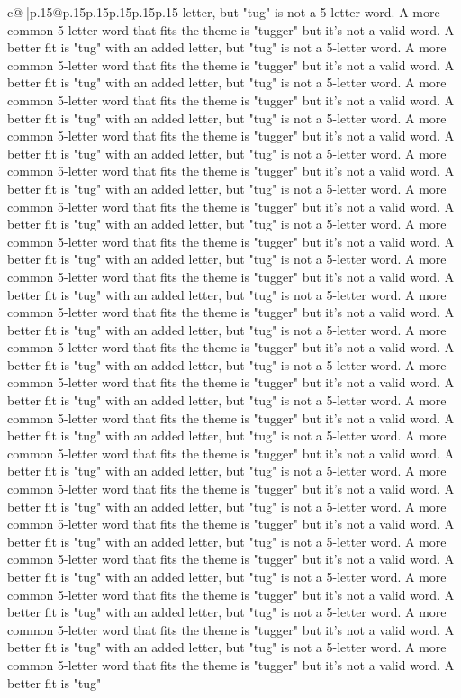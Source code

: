 \documentclass{article}
\begin{document}
{\begin{supertabular}{c@{$\;$}|p{.15\linewidth}@{}p{.15\linewidth}p{.15\linewidth}p{.15\linewidth}p{.15\linewidth}p{.15\linewidth}}
{{{letter, but "tug" is not a 5{-}letter word. A more common 5{-}letter word that fits the theme is "tugger" but it's not a valid word. A better fit is "tug" with an added letter, but "tug" is not a 5{-}letter word. A more common 5{-}letter word that fits the theme is "tugger" but it's not a valid word. A better fit is "tug" with an added letter, but "tug" is not a 5{-}letter word. A more common 5{-}letter word that fits the theme is "tugger" but it's not a valid word. A better fit is "tug" with an added letter, but "tug" is not a 5{-}letter word. A more common 5{-}letter word that fits the theme is "tugger" but it's not a valid word. A better fit is "tug" with an added letter, but "tug" is not a 5{-}letter word. A more common 5{-}letter word that fits the theme is "tugger" but it's not a valid word. A better fit is "tug" with an added letter, but "tug" is not a 5{-}letter word. A more common 5{-}letter word that fits the theme is "tugger" but it's not a valid word. A better fit is "tug" with an added letter, but "tug" is not a 5{-}letter word. A more common 5{-}letter word that fits the theme is "tugger" but it's not a valid word. A better fit is "tug" with an added letter, but "tug" is not a 5{-}letter word. A more common 5{-}letter word that fits the theme is "tugger" but it's not a valid word. A better fit is "tug" with an added letter, but "tug" is not a 5{-}letter word. A more common 5{-}letter word that fits the theme is "tugger" but it's not a valid word. A better fit is "tug" with an added letter, but "tug" is not a 5{-}letter word. A more common 5{-}letter word that fits the theme is "tugger" but it's not a valid word. A better fit is "tug" with an added letter, but "tug" is not a 5{-}letter word. A more common 5{-}letter word that fits the theme is "tugger" but it's not a valid word. A better fit is "tug" with an added letter, but "tug" is not a 5{-}letter word. A more common 5{-}letter word that fits the theme is "tugger" but it's not a valid word. A better fit is "tug" with an added letter, but "tug" is not a 5{-}letter word. A more common 5{-}letter word that fits the theme is "tugger" but it's not a valid word. A better fit is "tug" with an added letter, but "tug" is not a 5{-}letter word. A more common 5{-}letter word that fits the theme is "tugger" but it's not a valid word. A better fit is "tug" with an added letter, but "tug" is not a 5{-}letter word. A more common 5{-}letter word that fits the theme is "tugger" but it's not a valid word. A better fit is "tug" with an added letter, but "tug" is not a 5{-}letter word. A more common 5{-}letter word that fits the theme is "tugger" but it's not a valid word. A better fit is "tug" with an added letter, but "tug" is not a 5{-}letter word. A more common 5{-}letter word that fits the theme is "tugger" but it's not a valid word. A better fit is "tug" with an added letter, but "tug" is not a 5{-}letter word. A more common 5{-}letter word that fits the theme is "tugger" but it's not a valid word. A better fit is "tug" with an added letter, but "tug" is not a 5{-}letter word. A more common 5{-}letter word that fits the theme is "tugger" but it's not a valid word. A better fit is "tug" }}}
\end{supertabular}}
\end{document}
